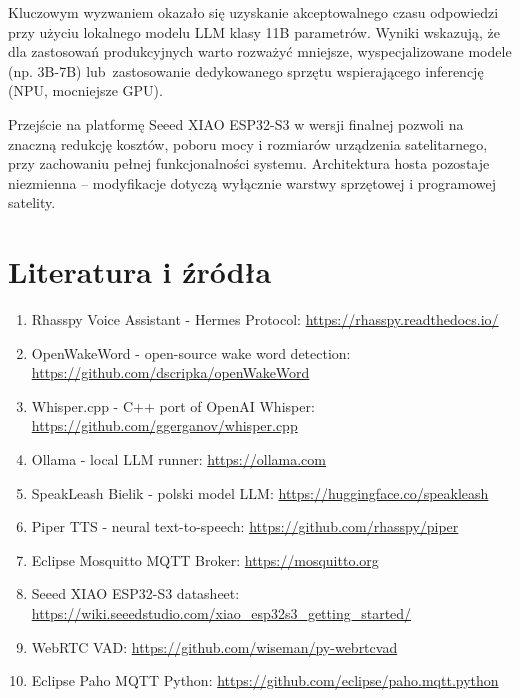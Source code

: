 \documentclass[12pt,a4paper]{article}
\begin{document}
Kluczowym wyzwaniem okazało się uzyskanie akceptowalnego czasu odpowiedzi przy użyciu lokalnego modelu LLM klasy 11B parametrów. Wyniki wskazują, że dla zastosowań produkcyjnych warto rozważyć mniejsze, wyspecjalizowane modele (np. 3B-7B) lub~zastosowanie dedykowanego sprzętu wspierającego inferencję (NPU, mocniejsze GPU).

Przejście na platformę Seeed XIAO ESP32-S3 w wersji finalnej pozwoli na znaczną redukcję kosztów, poboru mocy i rozmiarów urządzenia satelitarnego, przy zachowaniu pełnej funkcjonalności systemu. Architektura hosta pozostaje niezmienna – modyfikacje dotyczą wyłącznie warstwy sprzętowej i programowej satelity.

\section{Literatura i źródła}
\begin{enumerate}
    \item Rhasspy Voice Assistant - Hermes Protocol: \url{https://rhasspy.readthedocs.io/}
    \item OpenWakeWord - open-source wake word detection: \url{https://github.com/dscripka/openWakeWord}
    \item Whisper.cpp - C++ port of OpenAI Whisper: \url{https://github.com/ggerganov/whisper.cpp}
    \item Ollama - local LLM runner: \url{https://ollama.com}
    \item SpeakLeash Bielik - polski model LLM: \url{https://huggingface.co/speakleash}
    \item Piper TTS - neural text-to-speech: \url{https://github.com/rhasspy/piper}
    \item Eclipse Mosquitto MQTT Broker: \url{https://mosquitto.org}
    \item Seeed XIAO ESP32-S3 datasheet: \url{https://wiki.seeedstudio.com/xiao_esp32s3_getting_started/}
    \item WebRTC VAD: \url{https://github.com/wiseman/py-webrtcvad}
    \item Eclipse Paho MQTT Python: \url{https://github.com/eclipse/paho.mqtt.python}
\end{enumerate}
\end{document}
